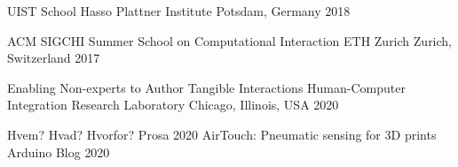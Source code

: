 
    \begin{cventries}
      \cventry
        {UIST School}
        {Hasso Plattner Institute}
        {Potsdam, Germany}
        {2018}
        {}

      \cventry
        {ACM SIGCHI Summer School on Computational Interaction}
        {ETH Zurich}
        {Zurich, Switzerland}
        {2017}
        {}
    \end{cventries}

    \begin{cventries}
      \cventry
        {Enabling Non-experts to Author Tangible Interactions}
        {Human-Computer Integration Research Laboratory}
        {Chicago, Illinois, USA}
        {2020}
        {
          \vspace{1em}
        }
    \end{cventries}

    \begin{cventries}
      \cventry
        {Hvem? Hvad? Hvorfor?}
        {Prosa}
        {}
        {2020}
        {}
      \cventry
        {AirTouch: Pneumatic sensing for 3D prints}
        {Arduino Blog}
        {}
        {2020}
        {}
    \end{cventries}


